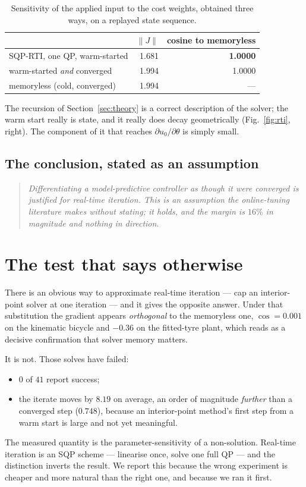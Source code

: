 \documentclass[letterpaper, 10 pt, conference]{ieeeconf}
\begin{document}
\begin{table}[t]
  \centering
  \caption{Sensitivity of the applied input to the cost weights, obtained three
  ways, on a replayed state sequence.}
  \label{tab:rti}
  \begin{tabular}{lrr}
    \toprule
    & $\lVert J\rVert$ & cosine to memoryless \\
    \midrule
    SQP-RTI, one QP, warm-started & 1.681 & \textbf{1.0000} \\
    warm-started \emph{and} converged & 1.994 & 1.0000 \\
    memoryless (cold, converged) & 1.994 & --- \\
    \bottomrule
  \end{tabular}
\end{table}

The recursion of Section~\ref{sec:theory} is a correct description of the
solver; the warm start really is state, and it really does decay geometrically
(Fig.~\ref{fig:rti}, right). The component of it that reaches
$\partial u_0/\partial\theta$ is simply small.

\subsection{The conclusion, stated as an assumption}
\begin{quote}\itshape
Differentiating a model-predictive controller as though it were converged is
justified for real-time iteration. This is an assumption the online-tuning
literature makes without stating; it holds, and the margin is $16\%$ in
magnitude and nothing in direction.
\end{quote}

\section{The test that says otherwise}\label{sec:trap}

There is an obvious way to approximate real-time iteration --- cap an
interior-point solver at one iteration --- and it gives the opposite answer.
Under that substitution the gradient appears \emph{orthogonal} to the
memoryless one, $\cos = 0.001$ on the kinematic bicycle and $-0.36$ on the
fitted-tyre plant, which reads as a decisive confirmation that solver memory
matters.

It is not. Those solves have failed:
\begin{itemize}
  \item $0$ of $41$ report success;
  \item the iterate moves by $8.19$ on average, an order of magnitude
        \emph{further} than a converged step ($0.748$), because an
        interior-point method's first step from a warm start is large and not
        yet meaningful.
\end{itemize}
The measured quantity is the parameter-sensitivity of a non-solution. Real-time
iteration is an SQP scheme --- linearise once, solve one full QP --- and the
distinction inverts the result. We report this because the wrong experiment is
cheaper and more natural than the right one, and because we ran it first.
\end{document}
